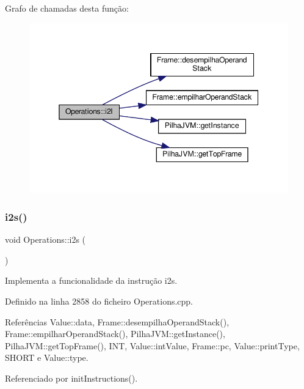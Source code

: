 Grafo de chamadas desta função\+:\nopagebreak
\begin{figure}[H]
\begin{center}
\leavevmode
\includegraphics[width=345pt]{classOperations_ae5d28665a74411cbb880e3007c5405e8_cgraph}
\end{center}
\end{figure}
\mbox{\label{classOperations_ab83ebb06495a6e42c5edeec05e312f8c}} 
\subsubsection{\texorpdfstring{i2s()}{i2s()}}
{\footnotesize\ttfamily void Operations\+::i2s (\begin{DoxyParamCaption}{ }\end{DoxyParamCaption})\hspace{0.3cm}{\ttfamily [private]}}



Implementa a funcionalidade da instrução i2s. 



Definido na linha 2858 do ficheiro Operations.\+cpp.



Referências Value\+::data, Frame\+::desempilha\+Operand\+Stack(), Frame\+::empilhar\+Operand\+Stack(), Pilha\+J\+V\+M\+::get\+Instance(), Pilha\+J\+V\+M\+::get\+Top\+Frame(), I\+NT, Value\+::int\+Value, Frame\+::pc, Value\+::print\+Type, S\+H\+O\+RT e Value\+::type.



Referenciado por init\+Instructions().

